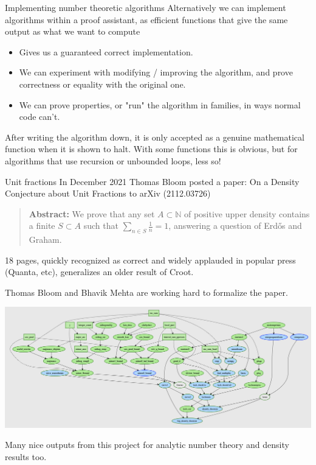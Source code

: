 \documentclass{beamer}
\theoremstyle{plain}
\begin{document}

\begin{frame}{Implementing number theoretic algorithms}
    Alternatively we can implement algorithms within a proof assistant, as efficient functions that give the same output as what we want to compute
    \begin{itemize}
        \item Gives us a guaranteed correct implementation.
        \item We can experiment with modifying / improving the algorithm, and prove correctness or equality with the original one.
        \item We can prove properties, or "run" the algorithm in families, in ways normal code can't.
    \end{itemize}

    After writing the algorithm down, it is only accepted as a genuine mathematical function when it is shown to halt.
    With some functions this is obvious, but for algorithms that use recursion or unbounded loops, less so!
\end{frame}



\begin{frame}{Unit fractions}
    In December 2021 Thomas Bloom posted a paper: On a Density Conjecture about Unit Fractions to arXiv (2112.03726)
    \begin{quote}
        \textbf{Abstract:} We prove that any set $A \subset \mathbb{N}$ of positive upper density contains a finite $S \subset A$ such that $\sum_{n \in S} \frac{1}{n}=1$, answering a question of Erdős and Graham.
    \end{quote}
    18 pages, quickly recognized as correct and widely applauded in popular press (Quanta, etc), generalizes an older result of Croot.

    Thomas Bloom and Bhavik Mehta are working hard to formalize the paper.
\end{frame}

\begin{frame}
    \includegraphics[width=1.1\linewidth]{unit.png}

    Many nice outputs from this project for analytic number theory and density results too.
\end{frame}
\end{document}
